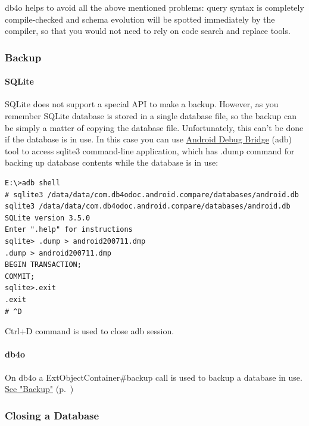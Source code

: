 db4o helps to avoid all the above mentioned problems: query syntax is completely compile-checked and schema evolution will be spotted immediately by the compiler, so that you would not need to rely on code search and replace tools.

\subsubsection{Backup}
\label{ref:platform-specific-issues-android-backup}

\paragraph*{SQLite}

SQLite does not support a special API to make a backup. However, as you remember SQLite database is stored in a single database file, so the backup can be simply a matter of copying the database file. Unfortunately, this can't be done if the database is in use. In this case you can use \href{https://developer.android.com/tools/adb}{Android Debug Bridge} (adb) tool to access sqlite3 command-line application, which has .dump command for backing up database contents while the database is in use:

\begin{lstlisting}
E:\>adb shell
# sqlite3 /data/data/com.db4odoc.android.compare/databases/android.db
sqlite3 /data/data/com.db4odoc.android.compare/databases/android.db
SQLite version 3.5.0
Enter ".help" for instructions
sqlite> .dump > android200711.dmp
.dump > android200711.dmp
BEGIN TRANSACTION;
COMMIT;
sqlite>.exit
.exit
# ^D
\end{lstlisting}

Ctrl+D command is used to close adb session.

\paragraph*{db4o}

On db4o a ExtObjectContainer\#backup call is used to backup a database in use. \hyperref[ref:advanced-topics-backup]{See "Backup"} (p.~\pageref{ref:advanced-topics-backup})

\subsubsection{Closing a Database}
\label{ref:platform-specific-issues-android-closing-a-database}

